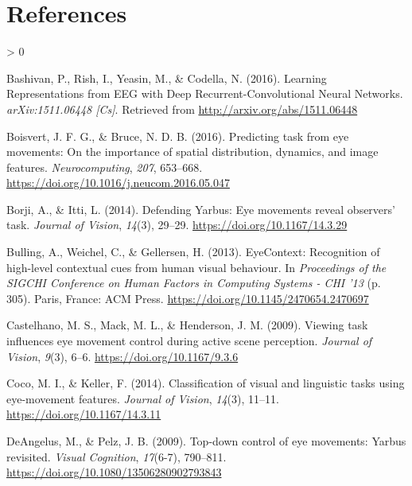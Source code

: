 \documentclass[
  english,
  man, donotrepeattitle,floatsintext]{apa6}
\newlength{\cslhangindent}
\newenvironment{CSLReferences}[2] %
 {%
  \setlength{\parindent}{0pt}
  \ifodd #1 \everypar{\setlength{\hangindent}{\cslhangindent}}\ignorespaces\fi
  \ifnum #2 > 0
  \setlength{\parskip}{#2\baselineskip}
  \fi
 }%
 {}
\begin{document}
\newpage

\hypertarget{references}{%
\section{References}\label{references}}

\begingroup
\setlength{\parindent}{-0.5in}
\setlength{\leftskip}{0.5in}

\hypertarget{refs}{}
\begin{CSLReferences}{1}{0}
\leavevmode\hypertarget{ref-bashivanLearningRepresentationsEEG2016}{}%
Bashivan, P., Rish, I., Yeasin, M., \& Codella, N. (2016). Learning {Representations} from {EEG} with {Deep Recurrent}-{Convolutional Neural Networks}. \emph{arXiv:1511.06448 {[}Cs{]}}. Retrieved from \url{http://arxiv.org/abs/1511.06448}

\leavevmode\hypertarget{ref-boisvertPredictingTaskEye2016a}{}%
Boisvert, J. F. G., \& Bruce, N. D. B. (2016). Predicting task from eye movements: {On} the importance of spatial distribution, dynamics, and image features. \emph{Neurocomputing}, \emph{207}, 653--668. \url{https://doi.org/10.1016/j.neucom.2016.05.047}

\leavevmode\hypertarget{ref-borjiDefendingYarbusEye2014}{}%
Borji, A., \& Itti, L. (2014). Defending {Yarbus}: {Eye} movements reveal observers' task. \emph{Journal of Vision}, \emph{14}(3), 29--29. \url{https://doi.org/10.1167/14.3.29}

\leavevmode\hypertarget{ref-bullingEyeContextRecognitionHighlevel2013a}{}%
Bulling, A., Weichel, C., \& Gellersen, H. (2013). {EyeContext}: {Recognition} of high-level contextual cues from human visual behaviour. In \emph{Proceedings of the {SIGCHI Conference} on {Human Factors} in {Computing Systems} - {CHI} '13} (p. 305). {Paris, France}: {ACM Press}. \url{https://doi.org/10.1145/2470654.2470697}

\leavevmode\hypertarget{ref-castelhanoViewingTaskInfluences2009a}{}%
Castelhano, M. S., Mack, M. L., \& Henderson, J. M. (2009). Viewing task influences eye movement control during active scene perception. \emph{Journal of Vision}, \emph{9}(3), 6--6. \url{https://doi.org/10.1167/9.3.6}

\leavevmode\hypertarget{ref-cocoClassificationVisualLinguistic2014a}{}%
Coco, M. I., \& Keller, F. (2014). Classification of visual and linguistic tasks using eye-movement features. \emph{Journal of Vision}, \emph{14}(3), 11--11. \url{https://doi.org/10.1167/14.3.11}

\leavevmode\hypertarget{ref-deangelusTopdownControlEye2009a}{}%
DeAngelus, M., \& Pelz, J. B. (2009). Top-down control of eye movements: {Yarbus} revisited. \emph{Visual Cognition}, \emph{17}(6-7), 790--811. \url{https://doi.org/10.1080/13506280902793843}


\end{CSLReferences}
\end{document}
